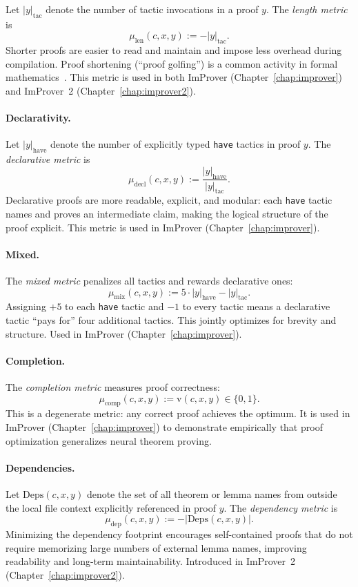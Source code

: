 Let $|y|_{\mathrm{tac}}$ denote the number of tactic invocations in a proof $y$. The \emph{length metric} is
\[
\mu_{\mathrm{len}}(c,x,y) := -|y|_{\mathrm{tac}}.
\]
Shorter proofs are easier to read and maintain and impose less overhead during compilation. Proof shortening (``proof golfing'') is a common activity in formal mathematics~\cite{Mathlib}. This metric is used in both ImProver (Chapter~\ref{chap:improver}) and ImProver~2 (Chapter~\ref{chap:improver2}).

\paragraph{Declarativity.}
\label{def:declarative}

Let $|y|_{\mathrm{have}}$ denote the number of explicitly typed \texttt{have} tactics in proof $y$. The \emph{declarative metric} is
\[
\mu_{\mathrm{decl}}(c,x,y) := \frac{|y|_{\mathrm{have}}}{|y|_{\mathrm{tac}}}.
\]
Declarative proofs \cite{serge2010,Wiedijk} are more readable, explicit, and modular: each \texttt{have} tactic names and proves an intermediate claim, making the logical structure of the proof explicit. This metric is used in ImProver (Chapter~\ref{chap:improver}).

\paragraph{Mixed.}
\label{def:mixed}
The \emph{mixed metric} penalizes all tactics and rewards declarative ones:
\[
\mu_{\mathrm{mix}}(c,x,y) := 5\cdot|y|_{\mathrm{have}} - |y|_{\mathrm{tac}}.
\]
Assigning $+5$ to each \texttt{have} tactic and $-1$ to every tactic means a declarative tactic ``pays for'' four additional tactics. This jointly optimizes for brevity and structure. Used in ImProver (Chapter~\ref{chap:improver}).


\paragraph{Completion.}
\label{def:completion}

The \emph{completion metric} measures proof correctness:
\[
\mu_{\mathrm{comp}}(c,x,y) := \mathrm{v}(c,x,y) \in \{0,1\}.
\]
This is a degenerate metric: any correct proof achieves the optimum. It is used in ImProver (Chapter~\ref{chap:improver}) to demonstrate empirically that proof optimization generalizes neural theorem proving.

\paragraph{Dependencies.}\label{def:dependencies}
Let $\mathrm{Deps}(c,x,y)$ denote the set of all theorem or lemma names from outside the local file context explicitly referenced in proof $y$. The \emph{dependency metric} is
\[
\mu_{\mathrm{dep}}(c, x, y) := -\left|\mathrm{Deps}(c, x, y)\right|.
\]
Minimizing the dependency footprint encourages self-contained proofs that do not require memorizing large numbers of external lemma names, improving readability and long-term maintainability. Introduced in ImProver~2 (Chapter~\ref{chap:improver2}).


